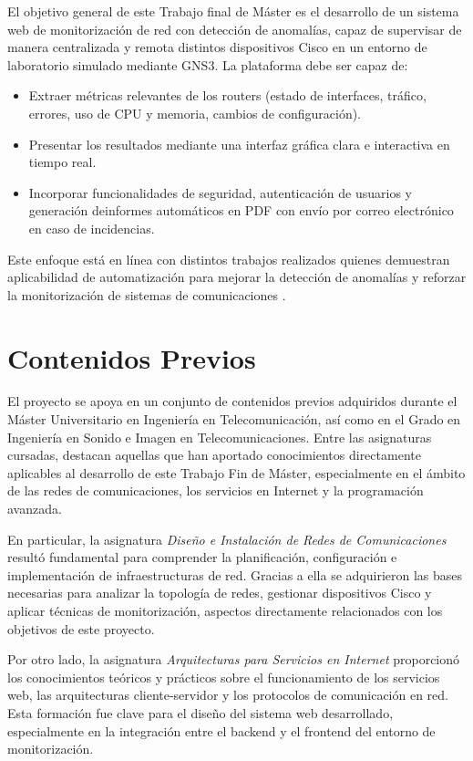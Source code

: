 El objetivo general de este Trabajo final de Máster es el desarrollo de un sistema web de monitorización de red con detección de anomalías, capaz de supervisar de manera centralizada y remota distintos dispositivos Cisco en un entorno de laboratorio simulado mediante GNS3. La plataforma debe ser capaz de:
\begin{itemize}
    \item Extraer métricas relevantes de los routers (estado de interfaces, tráfico, errores, uso de CPU y memoria, cambios de configuración).
    \item Presentar los resultados mediante una interfaz gráfica clara e interactiva en tiempo real.
    \item Incorporar funcionalidades de seguridad, autenticación de usuarios y generación deinformes automáticos en PDF con envío por correo electrónico en caso de incidencias.  
\end{itemize}
Este enfoque está en línea con distintos trabajos realizados quienes demuestran aplicabilidad de automatización para mejorar la detección de anomalías y reforzar la monitorización de sistemas de comunicaciones \citep{Schummer2024}. 

\section{Contenidos Previos}

El proyecto se apoya en un conjunto de contenidos previos adquiridos durante el Máster Universitario en Ingeniería en Telecomunicación, así como en el Grado en Ingeniería en Sonido e Imagen en Telecomunicaciones. Entre las asignaturas cursadas, destacan aquellas que han aportado conocimientos directamente aplicables al desarrollo de este Trabajo Fin de Máster, especialmente en el ámbito de las redes de comunicaciones, los servicios en Internet y la programación avanzada.

En particular, la asignatura \textit{Diseño e Instalación de Redes de Comunicaciones} resultó fundamental para comprender la planificación, configuración e implementación de infraestructuras de red. Gracias a ella se adquirieron las bases necesarias para analizar la topología de redes, gestionar dispositivos Cisco y aplicar técnicas de monitorización, aspectos directamente relacionados con los objetivos de este proyecto.

Por otro lado, la asignatura \textit{Arquitecturas para Servicios en Internet} proporcionó los conocimientos teóricos y prácticos sobre el funcionamiento de los servicios web, las arquitecturas cliente-servidor y los protocolos de comunicación en red. Esta formación fue clave para el diseño del sistema web desarrollado, especialmente en la integración entre el backend y el frontend del entorno de monitorización.

